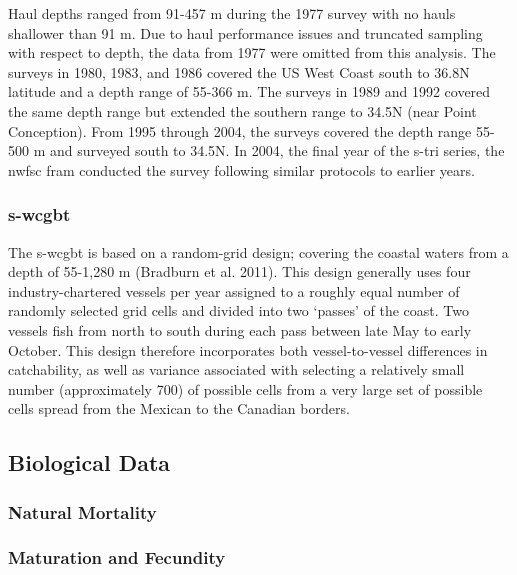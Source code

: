 \documentclass[11pt,
  english,
  letterpaper,
]{article}
\begin{document}
Haul depths ranged from 91-457 m during the 1977 survey with no hauls shallower than 91 m. Due to haul performance issues and truncated sampling with respect to depth, the data from 1977 were omitted from this analysis. The surveys in 1980, 1983, and 1986 covered the US West Coast south to 36.8\textdegree N latitude and a depth range of 55-366 m. The surveys in 1989 and 1992 covered the same depth range but extended the southern range to 34.5\textdegree N (near Point Conception). From 1995 through 2004, the surveys covered the depth range 55-500 m and surveyed south to 34.5\textdegree N. In 2004, the final year of the \gls{s-tri} series, the \gls{nwfsc} \gls{fram} conducted the survey following similar protocols to earlier years.

\hypertarget{section-3}{%
\subsubsection{\texorpdfstring{\acrlong{s-wcgbt}}{}}\label{section-3}}

The \Gls{s-wcgbt} is based on a random-grid design; covering the coastal waters from a depth of 55-1,280 m (Bradburn et al. 2011). This design generally uses four industry-chartered vessels per year assigned to a roughly equal number of randomly selected grid cells and divided into two `passes' of the coast. Two vessels fish from north to south during each pass between late May to early October. This design therefore incorporates both vessel-to-vessel differences in catchability, as well as variance associated with selecting a relatively small number (approximately 700) of possible cells from a very large set of possible cells spread from the Mexican to the Canadian borders.

\hypertarget{biological-data}{%
\subsection{Biological Data}\label{biological-data}}

\hypertarget{natural-mortality}{%
\subsubsection{Natural Mortality}\label{natural-mortality}}

\hypertarget{maturation-and-fecundity}{%
\subsubsection{Maturation and Fecundity}\label{maturation-and-fecundity}}
\end{document}
